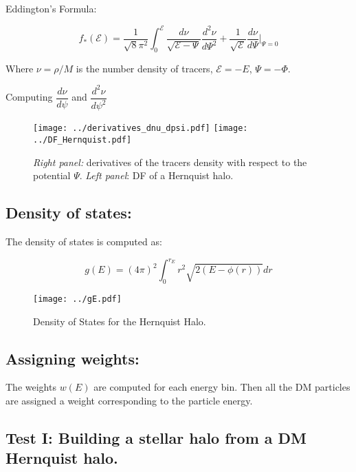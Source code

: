 \documentclass[14pt]{article}
\begin{document}
Eddington's Formula: 

\begin{equation}
  f_*(\mathcal{E}) = \dfrac{1}{\sqrt{8}\pi^2}\int_0^{\mathcal{E}} \dfrac{d
  \nu}{\sqrt{\mathcal{E}- \Psi}}  \dfrac{d^2 \nu}{d \Psi^2} +
  \dfrac{1}{\sqrt{\mathcal{E}}}\dfrac{d \nu}{d\Psi} \Bigg\vert _{\Psi=0} 
\end{equation}

Where $\nu=\rho/M$ is the number density of tracers, $\mathcal{E}=-E$,
$\Psi=-\Phi$.

Computing $\dfrac{d \nu}{d \psi}$ and $\dfrac{d^2 \nu}{d \psi^2}$


\begin{figure}[H]
  \centering
  \texttt{[image: ../derivatives\_dnu\_dpsi.pdf]}
  \texttt{[image: ../DF\_Hernquist.pdf]}
  \caption{\textit{Right panel:} derivatives of the tracers density with respect
  to the potential $\Psi$. \textit{Left panel}: DF of a Hernquist halo.}
\end{figure}



\subsection{Density of states:}


The density of states is computed as:

\begin{equation}
  g(E) = (4\pi)^2 \int_0^{r_E} r^2 \sqrt{2(E - \phi(r))} dr
\end{equation}


\begin{figure}[H]
  \centering
  \texttt{[image: ../gE.pdf]}
  \caption{Density of States for the Hernquist Halo.}
\end{figure}

\subsection{Assigning weights:}

The weights $w(E)$ are computed for each energy bin. Then all the DM particles
are assigned a weight corresponding to the particle energy.

\subsection{Test I: Building a stellar halo from a DM Hernquist halo.}
\end{document}
